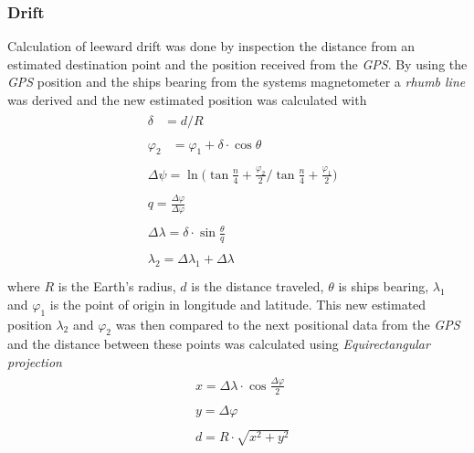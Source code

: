 \subsubsection{Drift}
Calculation of leeward drift was done by inspection the distance from an estimated destination point and the position received from the \textit{GPS}. By using the \textit{GPS} position and the ships bearing from the systems magnetometer a \textit{rhumb line}\cite{rhumb-line} was derived and the new estimated position was calculated with
\begin{align*}
  &\begin{aligned}
  \delta &= d/R 
  \end{aligned}\\
 &\begin{aligned}
  \varphi_2 &= \varphi_1 + \delta \cdot \cos{\theta}
  \end{aligned}\\
 &\begin{aligned}
  \Delta\psi = \ln { \bigg( \tan{\frac{n}{4} + \frac{\varphi_2}{2}} \bigg/ \tan{\frac{n}{4} + \frac{\varphi_1}{2}} \bigg)}
  \end{aligned}\\
 &\begin{aligned}
  q = \frac{\Delta\varphi}{\Delta\varphi}
  \end{aligned}\\
 &\begin{aligned}
  \Delta\lambda = \delta\cdot\sin\frac{\theta}{q}
  \end{aligned}\\
 &\begin{aligned}
  \lambda_2 = \Delta\lambda_1 + \Delta\lambda
  \end{aligned}\\
\end{align*}
where $R$ is the Earth's radius, $d$ is the distance traveled, $\theta$ is ships bearing, $\lambda_1$ and $\varphi_1$ is the point of origin in longitude and latitude. This new estimated position $\lambda_2$ and $\varphi_2$ was then compared to the next positional data from the \textit{GPS} and the distance between these points was calculated using \textit{Equirectangular projection}\cite{equirectangular}
\begin{align*}
  &\begin{aligned}
  x = \Delta\lambda \cdot \cos\frac{\Delta\varphi}{2}
  \end{aligned}\\
 &\begin{aligned}
  y = \Delta\varphi
  \end{aligned}\\
 &\begin{aligned}
  d = R\cdot\sqrt{x^2+y^2}
  \end{aligned}\\
\end{align*}

